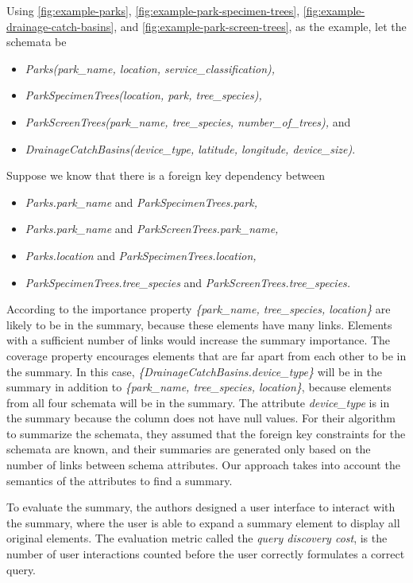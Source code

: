 Using \autoref{fig:example-parks}, \autoref{fig:example-park-specimen-trees}, \autoref{fig:example-drainage-catch-basins}, and \autoref{fig:example-park-screen-trees}, as the example, let the schemata be
\begin{itemize}
	\item[] \textit{Parks(park\_name, location, service\_classification),}
	\item[] \textit{ParkSpecimenTrees(location, park, tree\_species),}
	\item[] \textit{ParkScreenTrees(park\_name, tree\_species, number\_of\_trees),} and 
	\item[] \textit{DrainageCatchBasins(device\_type, latitude, longitude, device\_size)}.
\end{itemize}
Suppose we know that there is a foreign key dependency between
\begin{itemize}
	\item[] \textit{Parks.park\_name} and \textit{ParkSpecimenTrees.park,}
	\item[] \textit{Parks.park\_name} and \textit{ParkScreenTrees.park\_name,}
	\item[] \textit{Parks.location} and \textit{ParkSpecimenTrees.location,}
	\item[] \textit{ParkSpecimenTrees.tree\_species} and \textit{ParkScreenTrees.tree\_species.}
\end{itemize}
According to the importance property \textit{\{park\_name, tree\_species, location\}} are likely to be in the summary, because these elements have many links. Elements with a sufficient number of links would increase the summary importance. The coverage property encourages elements that are far apart from each other to be in the summary. In this case, \textit{\{DrainageCatchBasins.device\_type\}} will be in the summary in addition to \textit{\{park\_name, tree\_species, location\}}, because elements from all four schemata will be in the summary. The attribute \textit{device\_type} is in the summary because the column does not have null values. For their algorithm to summarize the schemata, they assumed that the foreign key constraints for the schemata are known, and their summaries are generated only based on the number of links between schema attributes. Our approach takes into account the semantics of the attributes to find a summary.

To evaluate the summary, the authors designed a user interface to interact with the summary, where the user is able to expand a summary element to display all original elements. The evaluation metric called the \textit{query discovery cost}, is the number of user interactions counted before the user correctly formulates a correct query.

